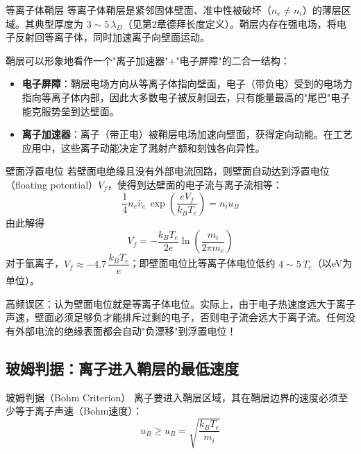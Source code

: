 \begin{definition}{等离子体鞘层}{}{}
\label{def:sheath}
等离子体鞘层是紧邻固体壁面、准中性被破坏（$n_e \neq n_i$）的薄层区域。其典型厚度为 $3\sim 5\,\lambda_D$（见第2章德拜长度定义）。鞘层内存在强电场，将电子反射回等离子体，同时加速离子向壁面运动。
\end{definition}

\begin{insight}{}{}
鞘层可以形象地看作一个"离子加速器"+"电子屏障"的二合一结构：
\begin{itemize}
\item \textbf{电子屏障}：鞘层电场方向从等离子体指向壁面，电子（带负电）受到的电场力指向等离子体内部，因此大多数电子被反射回去，只有能量最高的"尾巴"电子能克服势垒到达壁面。
\item \textbf{离子加速器}：离子（带正电）被鞘层电场加速向壁面，获得定向动能。在工艺应用中，这些离子动能决定了溅射产额和刻蚀各向异性。
\end{itemize}
\end{insight}

\begin{theorem}{壁面浮置电位}{}{}
\label{thm:floating-potential}
若壁面电绝缘且没有外部电流回路，则壁面自动达到浮置电位（floating potential）$V_f$，使得到达壁面的电子流与离子流相等：
\begin{equation}
\label{eq:floating-potential}
\frac{1}{4} n_e \bar{v}_e \,\exp\!\left(\frac{eV_f}{k_B T_e}\right) = n_i u_B
\end{equation}
由此解得
\begin{equation}
V_f = -\frac{k_B T_e}{2e} \ln\!\left(\frac{m_i}{2\pi m_e}\right)
\end{equation}
对于氩离子，$V_f \approx -4.7\,\dfrac{k_B T_e}{e}$；即壁面电位比等离子体电位低约 $4\sim 5\,T_e$（以eV为单位）。
\end{theorem}

\begin{warning}{}{}
高频误区：认为壁面电位就是等离子体电位。实际上，由于电子热速度远大于离子声速，壁面必须足够负才能排斥过剩的电子，否则电子流会远大于离子流。任何没有外部电流的绝缘表面都会自动"负漂移"到浮置电位！
\end{warning}

\subsection{玻姆判据：离子进入鞘层的最低速度}

\begin{theorem}{玻姆判据（Bohm Criterion）}{}{}
\label{thm:bohm-criterion}
离子要进入鞘层区域，其在鞘层边界的速度必须至少等于离子声速（Bohm速度）：
\begin{equation}
\label{eq:bohm-criterion}
u_B \ge u_B = \sqrt{\frac{k_B T_e}{m_i}}
\end{equation}
\end{theorem}

